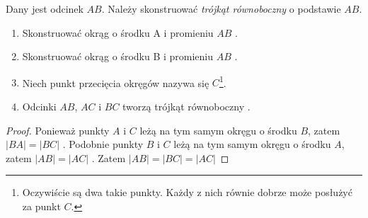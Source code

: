 \documentclass[12pt, a4paper]{scrartcl}
\begin{document}
\begin{theorem}

Dany jest odcinek \(AB\). Należy skonstruować \emph{trójkąt równoboczny} o
podstawie \(AB\).

\begin{figure}[h!]
    \begin{center}
    \end{center}
\end{figure}

\begin{enumerate}
    \item Skonstruować okrąg o środku A i promieniu \(AB\) .
    \item Skonstruować okrąg o środku B i promieniu \(AB\) .
    \item Niech punkt przecięcia okręgów nazywa się \(C\)\footnote{
        Oczywiście są dwa takie punkty. Każdy z nich równie dobrze może posłużyć
        za punkt \(C\).
    }.
    \item Odcinki \(AB\), \(AC\) i \(BC\) tworzą trójkąt równoboczny .
\end{enumerate}

\begin{proof}
    Ponieważ punkty \(A\) i \(C\) leżą na tym samym okręgu o środku \(B\), zatem
    \(|BA| = |BC|\) .
    Podobnie punkty \(B\) i \(C\) leżą na tym samym okręgu o środku \(A\), zatem
    \(|AB| = |AC|\) .
    Zatem \(|AB| = |BC| = |AC|\) 
\end{proof}
\end{theorem}
\end{document}
